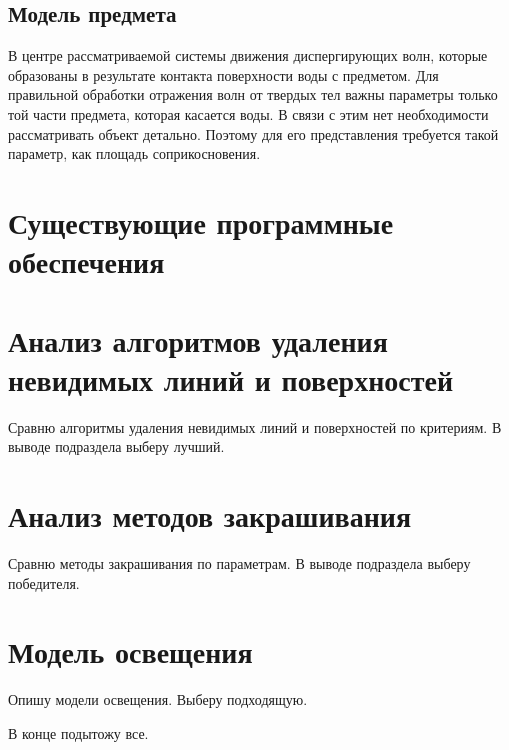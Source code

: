 \subsection{Модель предмета}

В центре рассматриваемой системы движения диспергирующих волн, которые образованы в результате контакта поверхности воды с предметом. Для правильной обработки отражения волн от твердых тел важны параметры только той части предмета, которая касается воды.  В связи с этим нет необходимости рассматривать объект детально. Поэтому для его представления требуется такой параметр, как площадь соприкосновения.

\section{Существующие программные обеспечения}

\section{Анализ алгоритмов удаления невидимых линий и поверхностей}

Сравню алгоритмы удаления невидимых линий и поверхностей по критериям. В выводе подраздела выберу лучший.

\section{Анализ методов закрашивания}

Сравню методы закрашивания по параметрам. В выводе подраздела выберу победителя.

\section{Модель освещения}

Опишу модели освещения. Выберу подходящую.

В конце подытожу все.